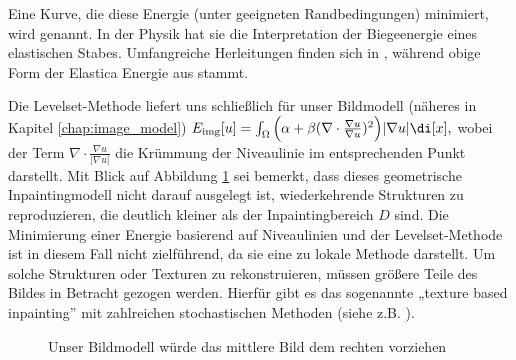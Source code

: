 \documentclass{mythesis}
\begin{document}
Eine Kurve, die diese Energie (unter geeigneten Randbedingungen) minimiert, wird  genannt.
In der Physik hat sie die Interpretation der Biegeenergie eines elastischen Stabes.
Umfangreiche Herleitungen finden sich in \cite{love1920treatise,antman2005problems}, während obige Form der Elastica Energie aus \cite{birkhoff1965nonlinear} stammt.

Die Levelset-Methode liefert uns schließlich für unser Bildmodell (näheres in Kapitel \ref{chap:image_model})
\begin{math}
    \Eimg[u] = \int_{\Omega} \Big(\alpha + \beta (\nabla \cdot \frac{\nabla u}{\nabla u})^2\Big)|\nabla u| \di[x],
\end{math}
wobei der Term $\nabla \cdot \frac{\nabla u}{|\nabla u|}$ die Krümmung der Niveaulinie im entsprechenden Punkt darstellt.
Mit Blick auf Abbildung \ref{fig:inpainting_texture} sei bemerkt, dass dieses geometrische Inpaintingmodell nicht darauf ausgelegt ist, wiederkehrende Strukturen zu reproduzieren, die deutlich kleiner als der Inpaintingbereich $D$ sind.
Die Minimierung einer Energie basierend auf Niveaulinien und der Levelset-Methode ist in diesem Fall nicht zielführend, da sie eine zu lokale Methode darstellt.
Um solche Strukturen oder Texturen zu rekonstruieren, müssen größere Teile des Bildes in Betracht gezogen werden.
Hierfür gibt es das sogenannte „texture based inpainting” mit zahlreichen stochastischen Methoden (siehe z.B. \cite{criminisi2004region}).

\begin{figure}[ht]
    \begin{subfigure}[b]{0.33\textwidth}
	\centering
    \end{subfigure}%
    \begin{subfigure}[b]{0.33\textwidth}
	\centering
    \end{subfigure}%
    \begin{subfigure}[b]{0.33\textwidth}
	\centering
    \end{subfigure}
    \caption{Unser Bildmodell würde das mittlere Bild dem rechten vorziehen}
    \label{fig:inpainting_texture}
\end{figure}
\end{document}
